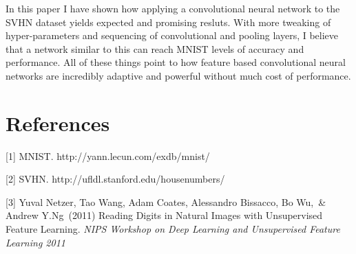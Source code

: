 \documentclass{article}
\begin{document}
	In this paper I have shown how applying a convolutional neural network to the SVHN dataset yields expected and promising resluts. With more tweaking of hyper-parameters and sequencing of convolutional and pooling layers, I believe that a network similar to this can reach MNIST levels of accuracy and performance. All of these things point to how feature based convolutional neural networks are incredibly adaptive and powerful without much cost of performance.
	
	
	\section*{References}
	

	\medskip
	
	\small
	
	[1] MNIST. http://yann.lecun.com/exdb/mnist/
	
	[2] SVHN. http://ufldl.stanford.edu/housenumbers/
	
	[3] Yuval Netzer, Tao Wang, Adam Coates, Alessandro Bissacco, Bo Wu,\ \& Andrew Y.Ng\ (2011) Reading Digits in Natural Images with Unsupervised Feature Learning. {\it NIPS Workshop on Deep Learning and Unsupervised Feature Learning 2011}
	
\end{document}
